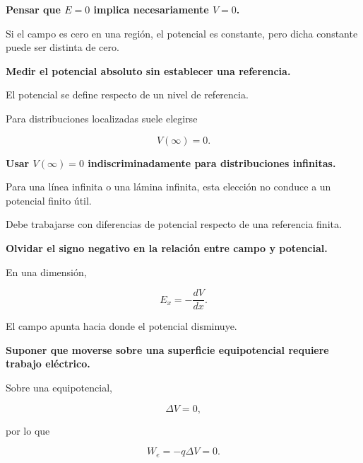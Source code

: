 \begin{errorfrecuente}

\textbf{Pensar que \(E=0\) implica necesariamente \(V=0\).}

Si el campo es cero en una región, el potencial es constante, pero dicha constante
puede ser distinta de cero.

\end{errorfrecuente}


\begin{errorfrecuente}

\textbf{Medir el potencial absoluto sin establecer una referencia.}

El potencial se define respecto de un nivel de referencia.

Para distribuciones localizadas suele elegirse

\[
V(\infty)=0.
\]

\end{errorfrecuente}


\begin{errorfrecuente}

\textbf{Usar \(V(\infty)=0\) indiscriminadamente para distribuciones infinitas.}

Para una línea infinita o una lámina infinita, esta elección no conduce a un potencial
finito útil.

Debe trabajarse con diferencias de potencial respecto de una referencia finita.

\end{errorfrecuente}


\begin{errorfrecuente}

\textbf{Olvidar el signo negativo en la relación entre campo y potencial.}

En una dimensión,

\[
E_x=-\frac{dV}{dx}.
\]

El campo apunta hacia donde el potencial disminuye.

\end{errorfrecuente}


\begin{errorfrecuente}

\textbf{Suponer que moverse sobre una superficie equipotencial requiere trabajo
eléctrico.}

Sobre una equipotencial,

\[
\Delta V=0,
\]

por lo que

\[
W_e=-q\Delta V=0.
\]

\end{errorfrecuente}



